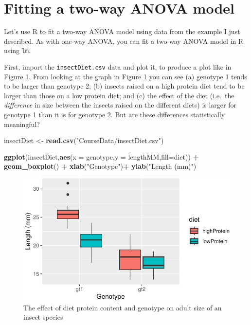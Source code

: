 \documentclass[
  a4paperpaper,
]{book}
\newenvironment{Shaded}{\begin{snugshade}}{\end{snugshade}}
\newcommand{\DataTypeTok}[1]{\textcolor[rgb]{0.13,0.29,0.53}{#1}}
\newcommand{\KeywordTok}[1]{\textcolor[rgb]{0.13,0.29,0.53}{\textbf{#1}}}
\newcommand{\NormalTok}[1]{#1}
\newcommand{\OperatorTok}[1]{\textcolor[rgb]{0.81,0.36,0.00}{\textbf{#1}}}
\newcommand{\StringTok}[1]{\textcolor[rgb]{0.31,0.60,0.02}{#1}}
\begin{document}
\hypertarget{fitting-a-two-way-anova-model}{%
\section{Fitting a two-way ANOVA model}\label{fitting-a-two-way-anova-model}}

Let's use R to fit a two-way ANOVA model using data from the example I just described. As with one-way ANOVA, you can fit a two-way ANOVA model in R using \texttt{lm}.

First, import the \texttt{insectDiet.csv} data and plot it, to produce a plot like in Figure \ref{fig:dietAndGenotype}. From looking at the graph in Figure \ref{fig:dietAndGenotype} you can see (a) genotype 1 tends to be larger than genotype 2; (b) insects raised on a high protein diet tend to be larger than those on a low protein diet; and (c) the effect of the diet (i.e.~the \emph{difference} in size between the insects raised on the different diets) is larger for genotype 1 than it is for genotype 2. But are these differences statistically meaningful?

\begin{Shaded}
\begin{Highlighting}[]
\NormalTok{insectDiet \textless{}{-}}\StringTok{ }\KeywordTok{read.csv}\NormalTok{(}\StringTok{"CourseData/insectDiet.csv"}\NormalTok{)}

\KeywordTok{ggplot}\NormalTok{(insectDiet,}\KeywordTok{aes}\NormalTok{(}\DataTypeTok{x =}\NormalTok{ genotype,}\DataTypeTok{y =}\NormalTok{ lengthMM,}\DataTypeTok{fill=}\NormalTok{diet)) }\OperatorTok{+}
\StringTok{  }\KeywordTok{geom\_boxplot}\NormalTok{() }\OperatorTok{+}
\StringTok{  }\KeywordTok{xlab}\NormalTok{(}\StringTok{"Genotype"}\NormalTok{)}\OperatorTok{+}
\StringTok{  }\KeywordTok{ylab}\NormalTok{(}\StringTok{"Length (mm)"}\NormalTok{)}
\end{Highlighting}
\end{Shaded}

\begin{figure}[ht]

{\centering \includegraphics{BB852_files/figure-latex/dietAndGenotype-1} 

}

\caption{The effect of diet protein content and genotype on adult size of an insect species}\label{fig:dietAndGenotype}
\end{figure}
\end{document}
